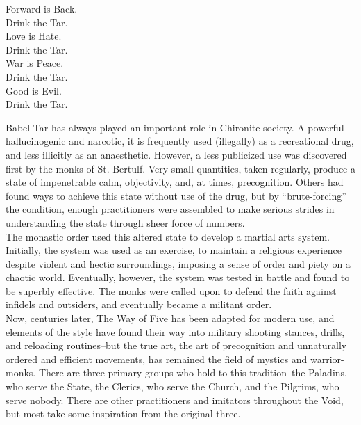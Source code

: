 \documentclass[a4paper, twocolumn, openany]{book}
\begin{document}
{{\noindent
Forward is Back.\\
Drink the Tar.\\

\noindent
Love is Hate.\\
Drink the Tar.\\

\noindent
War is Peace.\\
Drink the Tar.\\

\noindent
Good is Evil.\\
Drink the Tar.\\ } %

Babel Tar has always played an important role in Chironite society. A powerful hallucinogenic and narcotic, it
is frequently used (illegally) as a recreational drug, and less illicitly as an anaesthetic. However, a less
publicized use was discovered first by the monks of St. Bertulf. Very small quantities, taken regularly,
produce a state of impenetrable calm, objectivity, and, at times, precognition. Others had found ways to
achieve this state without use of the drug, but by “brute-forcing” the condition, enough practitioners were
assembled to make serious strides in understanding the state through sheer force of numbers.\\

The monastic order used this altered state to develop a martial arts system. Initially, the system was used as
an exercise, to maintain a religious experience despite violent and hectic surroundings, imposing a sense of
order and piety on a chaotic world. Eventually, however, the system was tested in battle and found to be
superbly effective. The monks were called upon to defend the faith against infidels and outsiders, and
eventually became a militant order.\\

Now, centuries later, The Way of Five has been adapted for modern use, and elements of the style have
found their way into military shooting stances, drills, and reloading routines--but the true art, the art of
precognition and unnaturally ordered and efficient movements, has remained the field of mystics and
warrior-monks. There are three primary groups who hold to this tradition--the Paladins, who serve the State,
the Clerics, who serve the Church, and the Pilgrims, who serve nobody. There are other practitioners and
imitators throughout the Void, but most take some inspiration from the original three.\\

}
\end{document}
